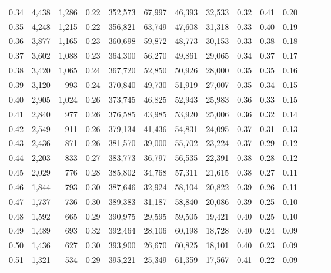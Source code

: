 \begin{tabular}{rrrrrrrrrrrrrr}
0.34 &   4,438 &  1,286 &  0.22 &  352,573 &   67,997 &  46,393 &  32,533 &  0.32 &  0.41 &      0.20 \\
0.35 &   4,248 &  1,215 &  0.22 &  356,821 &   63,749 &  47,608 &  31,318 &  0.33 &  0.40 &      0.19 \\
0.36 &   3,877 &  1,165 &  0.23 &  360,698 &   59,872 &  48,773 &  30,153 &  0.33 &  0.38 &      0.18 \\
0.37 &   3,602 &  1,088 &  0.23 &  364,300 &   56,270 &  49,861 &  29,065 &  0.34 &  0.37 &      0.17 \\
0.38 &   3,420 &  1,065 &  0.24 &  367,720 &   52,850 &  50,926 &  28,000 &  0.35 &  0.35 &      0.16 \\
0.39 &   3,120 &    993 &  0.24 &  370,840 &   49,730 &  51,919 &  27,007 &  0.35 &  0.34 &      0.15 \\
0.40 &   2,905 &  1,024 &  0.26 &  373,745 &   46,825 &  52,943 &  25,983 &  0.36 &  0.33 &      0.15 \\
0.41 &   2,840 &    977 &  0.26 &  376,585 &   43,985 &  53,920 &  25,006 &  0.36 &  0.32 &      0.14 \\
0.42 &   2,549 &    911 &  0.26 &  379,134 &   41,436 &  54,831 &  24,095 &  0.37 &  0.31 &      0.13 \\
0.43 &   2,436 &    871 &  0.26 &  381,570 &   39,000 &  55,702 &  23,224 &  0.37 &  0.29 &      0.12 \\
0.44 &   2,203 &    833 &  0.27 &  383,773 &   36,797 &  56,535 &  22,391 &  0.38 &  0.28 &      0.12 \\
0.45 &   2,029 &    776 &  0.28 &  385,802 &   34,768 &  57,311 &  21,615 &  0.38 &  0.27 &      0.11 \\
0.46 &   1,844 &    793 &  0.30 &  387,646 &   32,924 &  58,104 &  20,822 &  0.39 &  0.26 &      0.11 \\
0.47 &   1,737 &    736 &  0.30 &  389,383 &   31,187 &  58,840 &  20,086 &  0.39 &  0.25 &      0.10 \\
0.48 &   1,592 &    665 &  0.29 &  390,975 &   29,595 &  59,505 &  19,421 &  0.40 &  0.25 &      0.10 \\
0.49 &   1,489 &    693 &  0.32 &  392,464 &   28,106 &  60,198 &  18,728 &  0.40 &  0.24 &      0.09 \\
0.50 &   1,436 &    627 &  0.30 &  393,900 &   26,670 &  60,825 &  18,101 &  0.40 &  0.23 &      0.09 \\
0.51 &   1,321 &    534 &  0.29 &  395,221 &   25,349 &  61,359 &  17,567 &  0.41 &  0.22 &      0.09 \\

\end{tabular}

